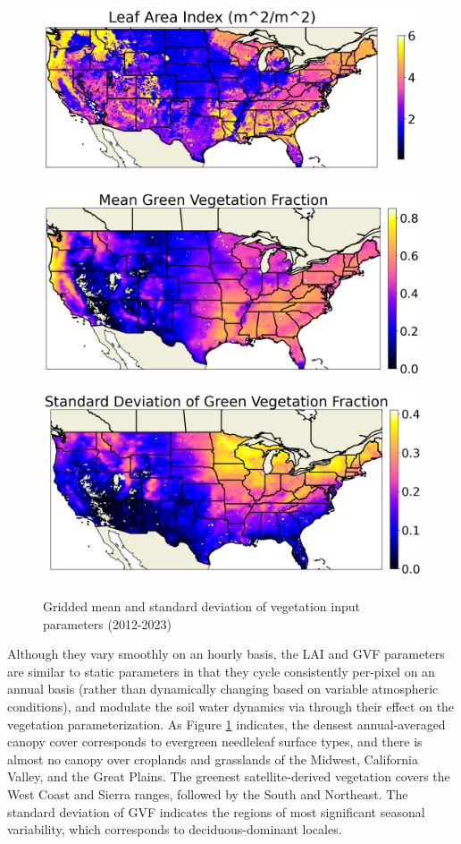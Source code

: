 \begin{figure}[h!]
    \centering
    \includegraphics[width=.48\linewidth,draft=false]{figures/thesis-gridstats/gridstat-bulk_lai_2012-1_2023-12_y000-195_x000-462_mean.png}

    \includegraphics[width=.48\linewidth,draft=false]{figures/thesis-gridstats/gridstat-bulk_veg_2012-1_2023-12_y000-195_x000-462_mean.png}
    \includegraphics[width=.48\linewidth,draft=false]{figures/thesis-gridstats/gridstat-bulk_veg_2012-1_2023-12_y000-195_x000-462_stdev.png}
    \caption{Gridded mean and standard deviation of vegetation input parameters (2012-2023)}
    \label{gs-vegetation}
\end{figure}

Although they vary smoothly on an hourly basis, the LAI and GVF parameters are similar to static parameters in that they cycle consistently per-pixel on an annual basis (rather than dynamically changing based on variable atmospheric conditions), and modulate the soil water dynamics via through their effect on the vegetation parameterization. As Figure \ref{gs-vegetation} indicates, the densest annual-averaged canopy cover corresponds to evergreen needleleaf surface types, and there is almost no canopy over croplands and grasslands of the Midwest, California Valley, and the Great Plains. The greenest satellite-derived vegetation covers the West Coast and Sierra ranges, followed by the South and Northeast. The standard deviation of GVF indicates the regions of most significant seasonal variability, which corresponds to deciduous-dominant locales.

